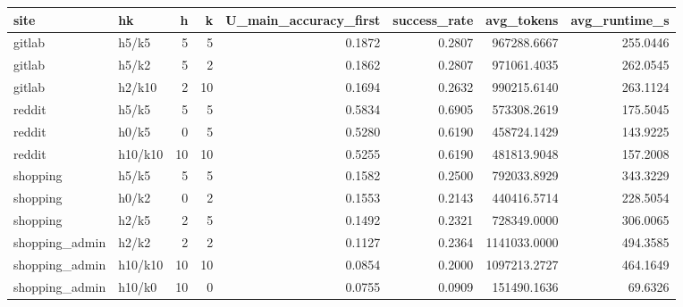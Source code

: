 \begin{tabular}{llrrrrrr}
\toprule
site & hk & h & k & U_main_accuracy_first & success_rate & avg_tokens & avg_runtime_s \\
\midrule
gitlab & h5/k5 & 5 & 5 & 0.1872 & 0.2807 & 967288.6667 & 255.0446 \\
gitlab & h5/k2 & 5 & 2 & 0.1862 & 0.2807 & 971061.4035 & 262.0545 \\
gitlab & h2/k10 & 2 & 10 & 0.1694 & 0.2632 & 990215.6140 & 263.1124 \\
reddit & h5/k5 & 5 & 5 & 0.5834 & 0.6905 & 573308.2619 & 175.5045 \\
reddit & h0/k5 & 0 & 5 & 0.5280 & 0.6190 & 458724.1429 & 143.9225 \\
reddit & h10/k10 & 10 & 10 & 0.5255 & 0.6190 & 481813.9048 & 157.2008 \\
shopping & h5/k5 & 5 & 5 & 0.1582 & 0.2500 & 792033.8929 & 343.3229 \\
shopping & h0/k2 & 0 & 2 & 0.1553 & 0.2143 & 440416.5714 & 228.5054 \\
shopping & h2/k5 & 2 & 5 & 0.1492 & 0.2321 & 728349.0000 & 306.0065 \\
shopping_admin & h2/k2 & 2 & 2 & 0.1127 & 0.2364 & 1141033.0000 & 494.3585 \\
shopping_admin & h10/k10 & 10 & 10 & 0.0854 & 0.2000 & 1097213.2727 & 464.1649 \\
shopping_admin & h10/k0 & 10 & 0 & 0.0755 & 0.0909 & 151490.1636 & 69.6326 \\
\bottomrule
\end{tabular}
